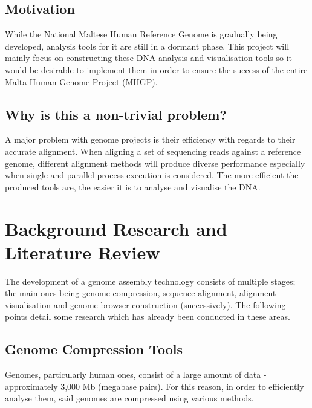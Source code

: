 \documentclass{csfyp}
\begin{document}
\subsection{Motivation}\vspace{-2ex}
While the National Maltese Human Reference Genome is gradually being developed, analysis tools for it are still in a dormant phase.  This project will mainly focus on constructing these DNA analysis and visualisation tools so it would be desirable to implement them in order to ensure the success of the entire Malta Human Genome Project (MHGP).   

\subsection{Why is this a non-trivial problem?}\vspace{-2ex}
A major problem with genome projects is their efficiency with regards to their accurate alignment.  When aligning a set of sequencing reads against a reference genome, different alignment methods will produce diverse performance especially when single and parallel process execution is considered.  The more efficient the produced tools are, the easier it is to analyse and visualise the DNA.     


\section{Background Research and Literature Review}\vspace{-2ex}

The development of a genome assembly technology consists of multiple stages; the main ones being genome compression, sequence alignment, alignment visualisation and genome browser construction (successively).  The following points detail some research which has already been conducted in these areas.

\subsection{Genome Compression Tools}\vspace{-2ex}
Genomes, particularly human ones, consist of a large amount of data - approximately 3,000 Mb (megabase pairs).  For this reason, in order to efficiently analyse them, said genomes are compressed using various methods.  
\end{document}

